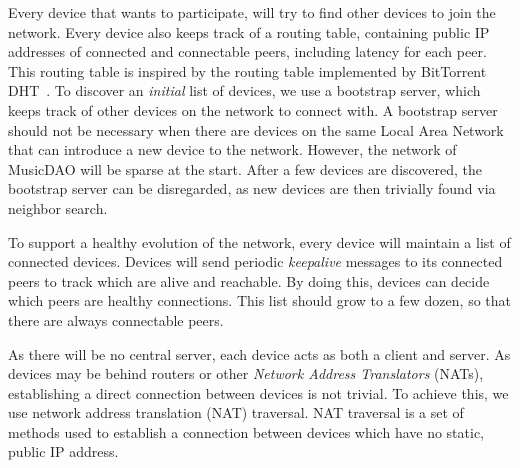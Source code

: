 Every device that wants to participate, will try to find other devices to join the network. Every device also keeps track of a routing table, containing public IP addresses of connected and connectable peers, including latency for each peer. This routing table is inspired by the routing table implemented by BitTorrent DHT~\citep{bittorrentbep5dht}. To discover an \textit{initial} list of devices, we use a bootstrap server, which keeps track of other devices on the network to connect with. A bootstrap server should not be necessary when there are devices on the same Local Area Network that can introduce a new device to the network. However, the network of MusicDAO will be sparse at the start. After a few devices are discovered, the bootstrap server can be disregarded, as new devices are then trivially found via neighbor search. 

To support a healthy evolution of the network, every device will maintain a list of connected devices. Devices will send periodic \textit{keepalive} messages to its connected peers to track which are alive and reachable. By doing this, devices can decide which peers are healthy connections. This list should grow to a few dozen, so that there are always connectable peers.

As there will be no central server, each device acts as both a client and server. As devices may be behind routers or other \textit{Network Address Translators} (NATs), establishing a direct connection between devices is not trivial. To achieve this, we use network address translation (NAT) traversal. NAT traversal is a set of methods used to establish a connection between devices which have no static, public IP address. 





